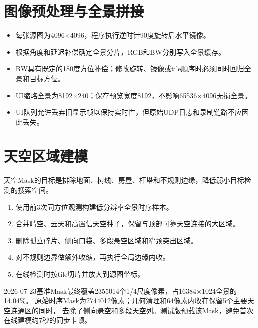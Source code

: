 \documentclass[UTF8,a4paper,11pt,openany]{ctexrep}
\begin{document}

\section{图像预处理与全景拼接}

\begin{itemize}
  \item 每张源图为4096$\times$4096，程序执行逆时针90度旋转后水平镜像。
  \item 根据角度和延迟补偿确定全景分片，RGB和BW分别写入全景缓存。
  \item BW具有既定的180度方位补偿；修改旋转、镜像或tile顺序时必须同时回归全景和目标方位。
  \item UI缩略全景为8192$\times$240；保存预览宽度8192，不影响65536$\times$4096无损全景。
  \item UI队列允许丢弃旧显示帧以保持实时性，但原始UDP日志和录制链路不应因此丢失。
\end{itemize}

\section{天空区域建模}

天空Mask的目标是排除地面、树线、房屋、杆塔和不规则边缘，降低弱小目标检测的搜索空间。

\begin{enumerate}
  \item 使用前3次同方位观测构建低分辨率全景时序样本。
  \item 合并晴空、云天和高置信天空种子，保留与顶部可靠天空连接的大区域。
  \item 删除孤立碎片、侧向口袋、多段悬空区域和窄颈突出区域。
  \item 对不规则边界做额外收缩，再执行全局边缘内收。
  \item 在线检测时按tile切片并放大到源图坐标。
\end{enumerate}

2026-07-23基准Mask最终覆盖2355014个1/4尺度像素，占16384$\times$1024全景的14.04\%。
原始时序Mask为2744012像素；几何清理和64像素内收在保留5个主要天空连通区的同时，
去除了侧向悬空和多段天空列。测试版预载该Mask，避免首次在线建模约7秒的同步卡顿。
\end{document}
